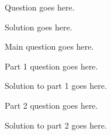 \documentclass{coursework}
\begin{document}
\nocoverpage

\item Question goes here.

	\begin{solution}
		Solution goes here.
	\end{solution}


\item Main question goes here.
	
	\begin{parts}
	
	\item Part 1 question goes here.
		
		\begin{solution}
			Solution to part 	1 goes here.
		\end{solution}
		
	\item Part 2 question goes here.
	
		\begin{solution}
			Solution to part 2 goes here.
		\end{solution}
		
		\end{parts}
		
\end{document}
